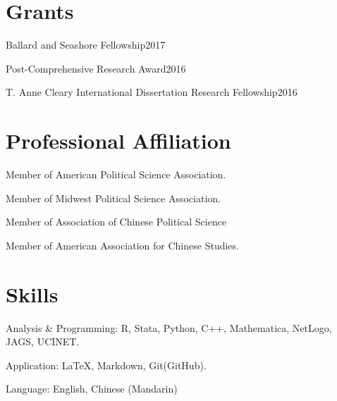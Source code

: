 \documentclass[10.5pt,]{article}
\providecommand{\tightlist}{%
	\setlength{\itemsep}{0pt}\setlength{\parskip}{0pt}}
\renewenvironment{itemize}{
	\begin{list}{}{
			\setlength{\leftmargin}{1.5em}
		}
	}{
	\end{list}
}
\begin{document}
\hypertarget{grants}{%
\section{Grants}\label{grants}}

\begin{itemize}
\tightlist
\item
  Ballard and Seashore Fellowship\hfill 2017
\item
  Post-Comprehensive Research Award\hfill 2016
\item
  T. Anne Cleary International Dissertation Research
  Fellowship\hfill 2016
\end{itemize}

\hypertarget{professional-affiliation}{%
\section{Professional Affiliation}\label{professional-affiliation}}

\begin{itemize}
\tightlist
\item
  Member of American Political Science Association.
\item
  Member of Midwest Political Science Association.
\item
  Member of Association of Chinese Political Science
\item
  Member of American Association for Chinese Studies.
\end{itemize}

\hypertarget{skills}{%
\section{Skills}\label{skills}}

\begin{itemize}
\tightlist
\item
  Analysis \& Programming: R, Stata, Python, C++, Mathematica, NetLogo,
  JAGS, UCINET.
\item
  Application: \LaTeX, Markdown, Git(GitHub).
\item
  Language: English, Chinese (Mandarin)
\end{itemize}
	
			
\end{document}
